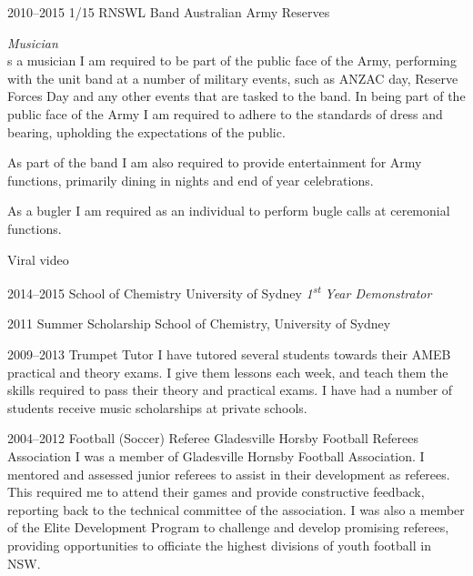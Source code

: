 \documentclass[]{friggeri-cv} %
\begin{document}
\begin{entrylist}

\entry
{2010--2015}
{1/15 RNSWL Band}
{Australian Army Reserves}
{\emph{Musician} \\
s a musician I am required to be part of the public face of the Army, performing with the unit band at a number of military events, such as ANZAC day, Reserve Forces Day and any other events that are tasked to the band. In being part of the public face of the Army I am required to adhere to the standards of dress and bearing, upholding the expectations of the public.

As part of the band I am also required to provide entertainment for Army functions, primarily dining in nights and end of year celebrations.

As a bugler I am required as an individual to perform bugle calls at ceremonial functions.

Viral video
}


\entry
{2014--2015}
{School of Chemistry}
{University of Sydney}
{\emph{1\textsuperscript{st} Year Demonstrator} \\

}


\entry
{2011}
{Summer Scholarship}
{School of Chemistry, University of Sydney}
{
}


\entry
{2009--2013}
{Trumpet Tutor}
{}
{I have tutored several students towards their AMEB practical and theory exams. I give them lessons each week, and teach them the skills required to pass their theory and practical exams. I have had a number of students receive music scholarships at private schools.}

\entry
{2004--2012}
{Football (Soccer) Referee}
{Gladesville Horsby Football Referees Association}
{I was a member of Gladesville Hornsby Football Association. I mentored and assessed junior referees to assist in their development as referees. This required me to attend their games and provide constructive feedback, reporting back to the technical committee of the association. I was also a member of the Elite Development Program to challenge and develop promising referees, providing opportunities to officiate the highest divisions of youth football in NSW.
}

\end{entrylist}
\end{document}
